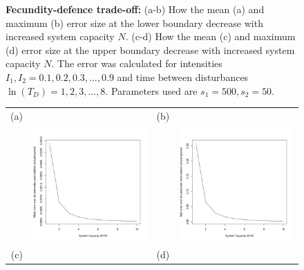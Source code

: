 \begin{figure}[th]
  \label{fig:fdtoapprox}
   \caption{\textbf{Fecundity-defence trade-off:} (a-b)  How the mean (a) and maximum (b) error size at the lower boundary decrease with increased system capacity $N$. (c-d) How the mean (c) and maximum (d) error size at the upper boundary decrease with increased system capacity $N$. The error was calculated for intensities $I_1,I_2=0.1,0.2,0.3,...,0.9$ and time between disturbances $\ln(T_D)=1,2,3,...,8.$ Parameters used are $s_1=500,s_2=50$.}
   \end{figure}
    \begin{figure}[th]
\centering
   \begin{tabular}{rrrr}
   (a)&&(b)&\\
  &\includegraphics[width=2.5in]{GDmeanerr.pdf} && \includegraphics[width=2.5in]{GDmaxerr.pdf} \\
  (c)&&(d)&\\

\end{tabular}
\end{figure}
